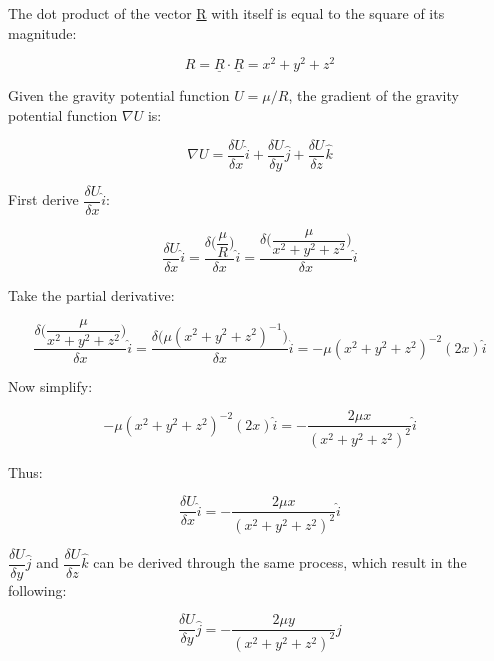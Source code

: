 \documentclass[conf]{new-aiaa}
\begin{document}
The dot product of the vector \underline{R} with itself is equal to the square of its magnitude: 

\begin{equation}
R = \underline{R} \cdot \underline{R} = x^2 + y^2 + z^2
\label{eq:rdot_square}
\end{equation}

Given the gravity potential function $U = \mu/R$, the gradient of the gravity potential function $ \nabla U $ is:

\begin{equation}
\nabla U = \frac{\delta U}{\delta x} \hat{i} + \frac{\delta U}{\delta y} \hat{j} + \frac{\delta U}{\delta z} \hat{k}  
\end{equation} 

First derive $\dfrac{\delta U}{\delta x} \hat{i}$: 

\begin{equation}
\frac{\delta U}{\delta x} \hat{i} = \dfrac{\delta \Big( \dfrac{\mu}{R} \Big) }{\delta x} \hat{i} = \dfrac{ \delta \Big( \dfrac{\mu}{x^2 + y^2 + z^2} \Big) }{\delta x} \hat{i}
\end{equation}

Take the partial derivative: 

\begin{equation}
\dfrac{ \delta \Big( \dfrac{\mu}{x^2 + y^2 + z^2} \Big) }{\delta x} \hat{i} = \dfrac{ \delta \big(\mu ( x^2 + y^2 + z^2 )^{-1} \big) }{\delta x} \hat{i} = -\mu ( x^2 + y^2 + z^2 )^{-2} ( 2x ) \hat{i}
\end{equation}

Now simplify: 

\begin{equation}
-\mu ( x^2 + y^2 + z^2 )^{-2} ( 2x ) \hat{i} = -\dfrac{2 \mu x}{ (x^2 + y^2 + z^2 )^2 } \hat{i}
\end{equation}

Thus: 

\begin{equation}
\dfrac{\delta U}{\delta x} \hat{i} = -\dfrac{2 \mu x}{ (x^2 + y^2 + z^2 )^2 } \hat{i}
\end{equation}

$\dfrac{\delta U}{\delta y} \hat{j} $ and $\dfrac{\delta U}{\delta z} \hat{k} $ can be derived through the same process, which result in the following: 

\begin{equation}
\dfrac{\delta U}{\delta y} \hat{j} = -\dfrac{2 \mu y}{ (x^2 + y^2 + z^2 )^2 } \hat{j}
\end{equation}
\end{document}
